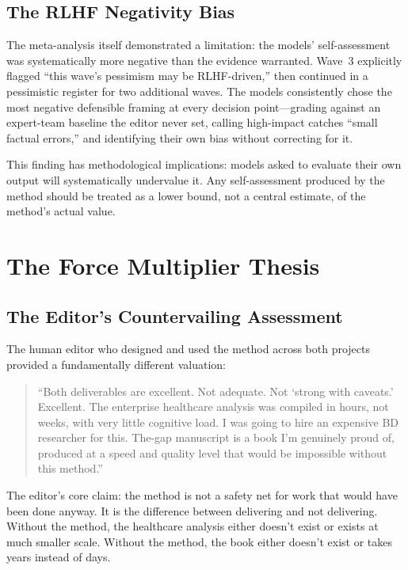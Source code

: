\documentclass[11pt,letterpaper]{article}
\begin{document}
\subsection{The RLHF Negativity Bias}

The meta-analysis itself demonstrated a limitation: the models' self-assessment was systematically more negative than the evidence warranted. Wave~3 explicitly flagged ``this wave's pessimism may be RLHF-driven,'' then continued in a pessimistic register for two additional waves. The models consistently chose the most negative defensible framing at every decision point---grading against an expert-team baseline the editor never set, calling high-impact catches ``small factual errors,'' and identifying their own bias without correcting for it.

This finding has methodological implications: models asked to evaluate their own output will systematically undervalue it. Any self-assessment produced by the method should be treated as a lower bound, not a central estimate, of the method's actual value.

\section{The Force Multiplier Thesis}
\label{sec:force-multiplier}

\subsection{The Editor's Countervailing Assessment}

The human editor who designed and used the method across both projects provided a fundamentally different valuation:

\begin{quote}
``Both deliverables are excellent. Not adequate. Not `strong with caveats.' Excellent. The enterprise healthcare analysis was compiled in hours, not weeks, with very little cognitive load. I was going to hire an expensive BD researcher for this. The-gap manuscript is a book I'm genuinely proud of, produced at a speed and quality level that would be impossible without this method.''
\end{quote}

The editor's core claim: the method is not a safety net for work that would have been done anyway. It is the difference between delivering and not delivering. Without the method, the healthcare analysis either doesn't exist or exists at much smaller scale. Without the method, the book either doesn't exist or takes years instead of days.
\end{document}
